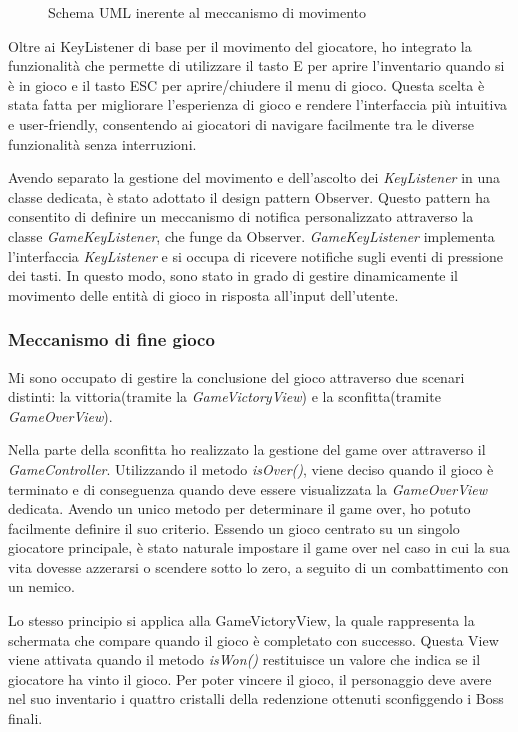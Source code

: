 \documentclass[a4paper,12pt]{report}
\begin{document}
\begin{figure}[H]
	\centering
	
	\caption{Schema UML inerente al meccanismo di movimento}
	\label{fig:the-exiled-movement-uml}
\end{figure}

Oltre ai KeyListener di base per il movimento del giocatore, ho integrato la funzionalità che permette di utilizzare il tasto E per aprire l'inventario quando si è in gioco e il tasto ESC per aprire/chiudere il menu di gioco. Questa scelta è stata fatta per migliorare l'esperienza di gioco e rendere l'interfaccia più intuitiva e user-friendly, consentendo ai giocatori di navigare facilmente tra le diverse funzionalità senza interruzioni.

Avendo separato la gestione del movimento e dell'ascolto dei \textit{KeyListener} in una classe dedicata, è stato adottato il design pattern Observer. Questo pattern ha consentito di definire un meccanismo di notifica personalizzato attraverso la classe \textit{GameKeyListener}, che funge da Observer. \textit{GameKeyListener} implementa l'interfaccia \textit{KeyListener} e si occupa di ricevere notifiche sugli eventi di pressione dei tasti. In questo modo, sono stato in grado di gestire dinamicamente il movimento delle entità di gioco in risposta all'input dell'utente.

\subsubsection{Meccanismo di fine gioco}
Mi sono occupato di gestire la conclusione del gioco attraverso due scenari distinti: la vittoria(tramite la \textit{GameVictoryView}) e la sconfitta(tramite \textit{GameOverView}).

Nella parte della sconfitta ho realizzato la gestione del game over attraverso il \textit{GameController}. Utilizzando il metodo \textit{isOver()}, viene deciso quando il gioco è terminato e di conseguenza quando deve essere visualizzata la \textit{GameOverView} dedicata. Avendo un unico metodo per determinare il game over, ho potuto facilmente definire il suo criterio. Essendo un gioco centrato su un singolo giocatore principale, è stato naturale impostare il game over nel caso in cui la sua vita dovesse azzerarsi o scendere sotto lo zero, a seguito di un combattimento con un nemico. 

Lo stesso principio si applica alla GameVictoryView, la quale rappresenta la schermata che compare quando il gioco è completato con successo. Questa View viene attivata quando il metodo \textit{isWon()} restituisce un valore che indica se il giocatore ha vinto il gioco. Per poter vincere il gioco, il personaggio deve avere nel suo inventario i quattro cristalli della redenzione ottenuti sconfiggendo i Boss finali.\\
\end{document}
